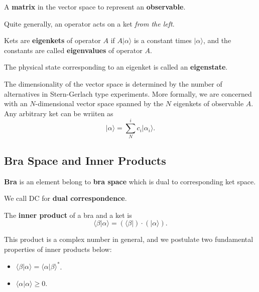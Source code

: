 \documentclass[11pt]{elegantbook}
\begin{document}
\begin{definition}[Operator]
  A \textbf{matrix} in the vector space to represent an \textbf{observable}.
\end{definition}
Quite generally, an operator acts on a ket \textit{from the left}.

\begin{definition}
  Kets are \textbf{eigenkets} of operator $A$ if $A\vert\alpha\rangle$ is a constant times $\vert\alpha\rangle$, and 
  the constants are called \textbf{eigenvalues} of operator $A$.

  The physical state corresponding to an eigenket is called an \textbf{eigenstate}.
\end{definition}

The dimensionality of the vector space is determined by the number of alternatives in 
Stern-Gerlach type experiments. More formally, we are concerned with an $N$-dimensional 
vector space spanned by the $N$ eigenkets of observable $A$. Any arbitrary ket can be 
wriiten as 
\begin{equation}
  \vert\alpha\rangle=\sum_N^ic_i\vert\alpha_i\rangle.
\end{equation}

\subsection{Bra Space and Inner Products}

\begin{definition}
  \textbf{Bra} is an element belong to \textbf{bra space} which is dual to corresponding ket space.
\end{definition}
We call DC for \textbf{dual correspondence}.

\begin{definition}
  The \textbf{inner product} of a bra and a ket is 
  \begin{equation}
    \langle\beta\vert\alpha\rangle=(\langle\beta\vert)\cdot(\vert\alpha\rangle).
  \end{equation}
\end{definition}
This product is a complex number in general, and we postulate two fundamental properties 
of inner products below:
\begin{itemize}
  \item $\langle\beta\vert\alpha\rangle=\langle\alpha\vert\beta\rangle^*$.
  \item $\langle\alpha\vert\alpha\rangle\geq 0$.
\end{itemize}
\end{document}

